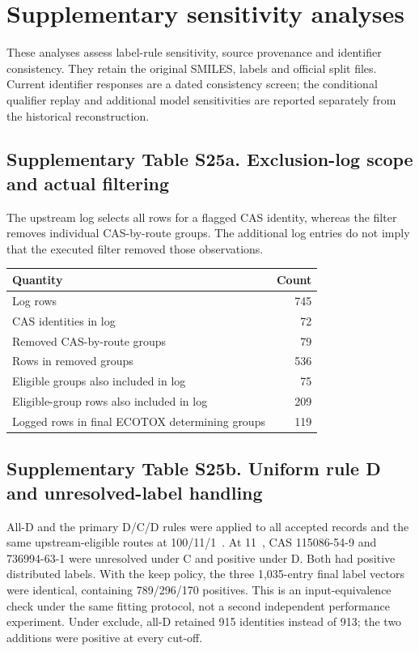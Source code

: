 \section*{Supplementary sensitivity analyses}

These analyses assess label-rule sensitivity, source provenance and identifier consistency. They retain the original
SMILES, labels and official split files. Current identifier responses are a dated
consistency screen; the conditional qualifier replay and additional model
sensitivities are reported separately from the historical reconstruction.

\subsection*{Supplementary Table S25a. Exclusion-log scope and actual filtering}

The upstream log selects all rows for a flagged CAS identity, whereas
the filter removes individual CAS-by-route groups. The additional log entries
do not imply that the executed filter removed those observations.

\begin{center}
\small
\begin{tabular}{lr}
\toprule
Quantity & Count \\
\midrule
Log rows & 745 \\
CAS identities in log & 72 \\
Removed CAS-by-route groups & 79 \\
Rows in removed groups & 536 \\
Eligible groups also included in log & 75 \\
Eligible-group rows also included in log & 209 \\
Logged rows in final ECOTOX determining groups & 119 \\
\bottomrule
\end{tabular}
\end{center}

\subsection*{Supplementary Table S25b. Uniform rule D and unresolved-label handling}

All-D and the primary D/C/D rules were applied to all accepted records
and the same upstream-eligible routes at 100/11/1~\ugbee. At 11~\ugbee, CAS
115086-54-9 and 736994-63-1 were unresolved under C and positive under D. Both
had positive distributed labels. With the keep policy, the three 1,035-entry
final label vectors were identical, containing 789/296/170 positives. This is an
input-equivalence check under the same fitting protocol, not a second independent
performance experiment. Under exclude, all-D retained 915 identities instead of
913; the two additions were positive at every cut-off.

